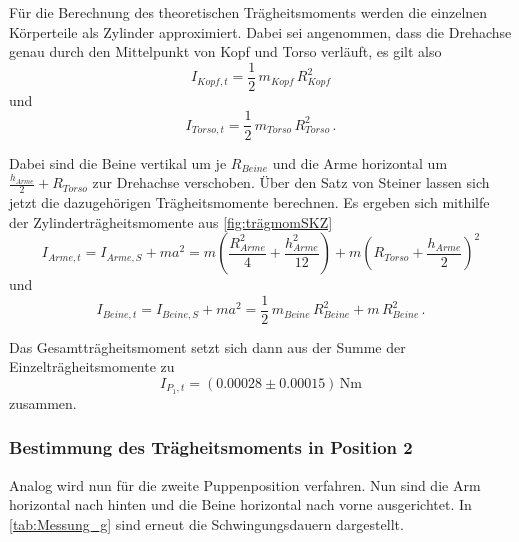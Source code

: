 Für die Berechnung des theoretischen Trägheitsmoments werden die einzelnen Körperteile als Zylinder approximiert. Dabei sei angenommen, dass die Drehachse genau durch den Mittelpunkt von Kopf und Torso verläuft, es gilt also
\begin{equation*}
  I_{Kopf,t} = \frac{1}{2} \, m_{Kopf} \, R^2_{Kopf}
\end{equation*}
und
\begin{equation*}
  I_{Torso,t} = \frac{1}{2} \, m_{Torso} \, R^2_{Torso} \,.
\end{equation*}

Dabei sind die Beine vertikal um je $R_{Beine}$ und die Arme horizontal um $\frac{h_{Arme}}{2} + R_{Torso}$ zur Drehachse verschoben. 
Über den Satz von Steiner lassen sich jetzt die dazugehörigen Trägheitsmomente berechnen.
Es ergeben sich mithilfe der Zylinderträgheitsmomente aus \autoref{fig:trägmomSKZ}
\begin{equation*}
  I_{Arme,t} = I_{Arme,S} + m a^2 = m \left(\frac{R^2_{Arme}}{4} + \frac{h^2_{Arme}}{12} \right) + m \left(R_{Torso} + \frac{h_{Arme}}{2} \right)^2
\end{equation*}
und
\begin{equation*}
  I_{Beine,t} = I_{Beine,S} + m a^2 = \frac{1}{2} \, m_{Beine} \, R^2_{Beine} + m \, R^2_{Beine}\,.
\end{equation*}

Das Gesamtträgheitsmoment setzt sich dann aus der Summe der Einzelträgheitsmomente zu
\begin{equation*}
  I_{P_1,t} = (0.00028 \pm 0.00015) \, \unit{\newton\meter}
\end{equation*}
zusammen.

\newpage

\subsubsection{Bestimmung des Trägheitsmoments in Position 2}
\label{subsubsec:pos2}

Analog wird nun für die zweite Puppenposition verfahren. 
Nun sind die Arm horizontal nach hinten und die Beine horizontal nach vorne ausgerichtet. 
In \autoref{tab:Messung_g} sind erneut die Schwingungsdauern dargestellt.

